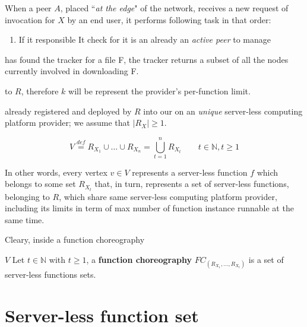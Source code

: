 \documentclass[10pt,a4paper]{article}
\newcommand{\mathDef}{\overset{\textit{def}}{=}}
\begin{document}
When a peer $A$, placed ``\textit{at the edge}" of the network, receives a new request of invocation for $X$ by an end user, it performs following task in that order:

\begin{enumerate}
\item If it responsible It check for it is an already an \textit{active peer} to manage 
\end{enumerate}




 has found the tracker for a file F, the tracker returns a subset
of all the nodes currently involved in downloading F.











to $R$, therefore $k$ will be represent the provider's per-function limit.







 already registered and deployed by $R$ into our on an \textit{unique} server-less computing platform provider; we assume that $|R_{X}| \geq 1$.





\begin{equation}
V \mathDef R_{{X}_{1}} \cup  \ldots \cup R_{{X}_{n}} = \bigcup_{t = 1}^n R_{{X}_{t}} \qquad t \in \mathbb{N}, t \geq 1 
\end{equation}

In other words, every vertex $v \in V$ represents a server-less function $f$ which belongs to some set $R_{{X}_{t}}$ that, in turn, represents a set of server-less functions, belonging to $R$, which share same server-less computing platform provider, including its limits in term of max number of function instance runnable at the same time. 



Cleary, inside a function choreography



 $V $
Let $t \in \mathbb{N}$ with $t \geq 1$, a \textbf{function choreography} $FC_{(R_{{X}_{1}}, \ldots,R_{{X}_{t}})}$ is a set of server-less functions sets. 




\section{Server-less function set}
\end{document}
